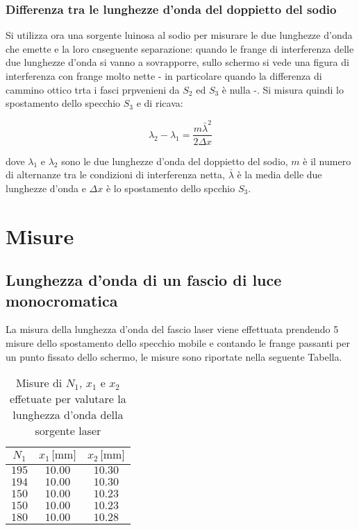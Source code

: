\documentclass[]{article}
\let\oldsection\section%
\renewcommand{\section}{%
	\renewcommand{\theequation}{\thesection.\arabic{equation}}%
	\oldsection}%
\let\oldsubsection\subsection%
\renewcommand{\subsection}{%
	\renewcommand{\theequation}{\thesubsection.\arabic{equation}}%
	\oldsubsection}%
\begin{document}
\subsubsection{Differenza tra le lunghezze d'onda del doppietto del sodio}

Si utilizza ora una sorgente luinosa al sodio per misurare le due lunghezze d'onda che emette e la loro cnseguente separazione: quando le frange di interferenza delle due lunghezze d'onda si vanno a sovrapporre, sullo schermo si vede una figura di interferenza con frange molto nette - in particolare quando la differenza di cammino ottico trta i fasci prpvenieni da $S_2$ ed $S_3$ è nulla -. 
Si misura quindi lo spostamento dello specchio $S_3$ e di ricava:

\begin{equation}
    \label{Delta_lambda}
    \lambda _2 - \lambda _1 = \frac {m \bar{\lambda} ^2 }{2 \Delta x}
\end{equation}

dove $\lambda _1$ e $\lambda _2$ sono le due lunghezze d'onda del doppietto del sodio, $m$ è il numero di alternanze tra le condizioni di interferenza netta, $\bar{\lambda}$ è la media delle due lunghezze d'onda e $\Delta x$ è lo spostamento dello spcchio $S_3$.

\section{Misure}

\subsection {Lunghezza d'onda di un fascio di luce monocromatica}

La misura della lunghezza d'onda del fascio laser viene effettuata prendendo 5 misure dello spostamento dello specchio mobile e contando le frange passanti per un punto fissato dello schermo, le misure sono riportate nella seguente Tabella.

\begin{table}[H]
    \centering

    \begin{tabular}{||c|c|c||}
        \hline
        $N_1 $ & $x_1 \, \text{[mm]}$ & $x_2\, \text{[mm]}$ \\
        \hline\hline

        $195$ & $10.00$ & $10.30$ \\\hline
        $194$ & $10.00$ & $10.30$ \\\hline
        $150$ & $10.00$ & $10.23$ \\\hline
        $150$ & $10.00$ & $10.23$ \\\hline
        $180$ & $10.00$ & $10.28$ \\\hline
    
    \end{tabular}
    \caption{Misure di $N_1$, $x_1$ e $x_2$ effetuate per valutare la lunghezza d'onda della sorgente laser}
    \label{lambda}    
\end{table}
\end{document}
